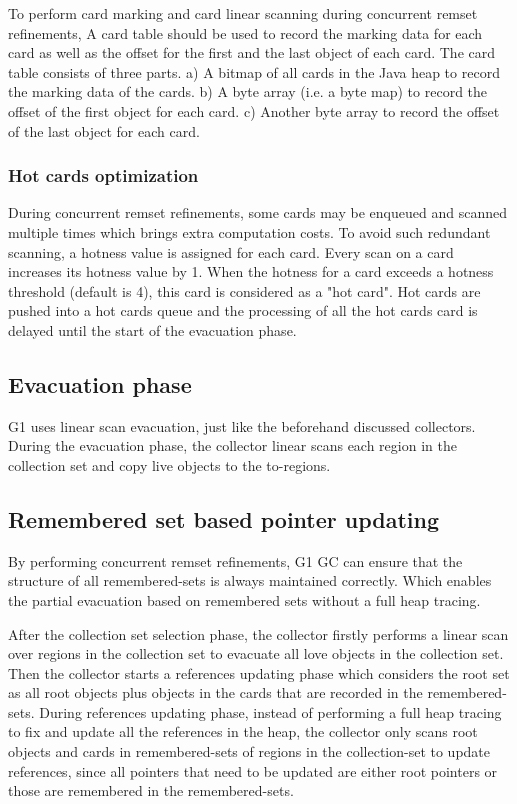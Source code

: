 To perform card marking and card linear scanning during concurrent remset refinements,
A card table should be used to record the marking data for each card as well as the offset
for the first and the last object of each card.
The card table consists of three parts. a) A bitmap of all cards in the Java heap
to record the marking data of the cards. b) A byte array (i.e. a byte map) to record the
offset of the first object for each card. c) Another byte array to record the
offset of the last object for each card.

\subsubsection{Hot cards optimization}

During concurrent remset refinements, some cards may be enqueued and scanned multiple times
which brings extra computation costs. To avoid such redundant scanning,
a hotness value is assigned for each card. Every scan on a card increases its hotness value by 1.
When the hotness for a card exceeds a hotness threshold (default is 4), this card is considered
as a "hot card". Hot cards are pushed into a hot cards queue and the processing
of all the hot cards card is delayed until the start of the evacuation phase.

\subsection{Evacuation phase}

G1 uses linear scan evacuation, just like the beforehand discussed collectors.
During the evacuation phase, the collector linear scans each region in the collection
set and copy live objects to the to-regions.

\subsection{Remembered set based pointer updating}

By performing concurrent remset refinements, G1 GC can ensure that the structure of all remembered-sets is always maintained correctly.
Which enables the partial evacuation based on remembered sets without a full heap tracing.

After the collection set selection phase, the collector firstly performs a linear
scan over regions in the collection set to evacuate all love objects in the collection set.
Then the collector starts a references updating phase which considers
the root set as all root objects plus objects in the cards that are recorded in the remembered-sets.
During references updating phase, instead of performing a full heap tracing to fix and
update all the references in the heap, the collector only scans root objects and
cards in remembered-sets of regions in the collection-set to update references,
since all pointers that need to be updated are either root pointers or those are remembered in the remembered-sets.

